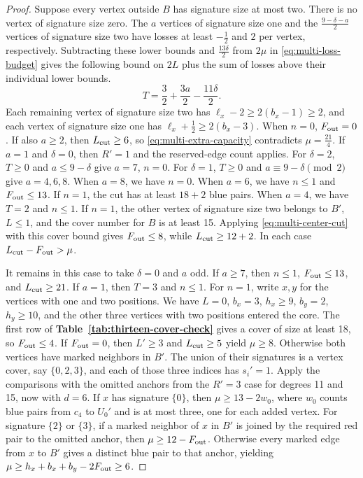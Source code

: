 \documentclass[preprint,11pt,numbers]{elsarticle-arxiv}
\numberwithin{equation}{section}
\theoremstyle{definition}
\begin{document}
\begin{proof}
Suppose every vertex outside $B$ has signature size at most two.
There is no vertex of signature size zero. The $a$ vertices of
signature size one and the $\frac{9-\delta-a}{2}$ vertices of
signature size two have losses at least $-\frac{1}{2}$ and $2$
per vertex, respectively. Subtracting these lower bounds and
$\frac{13\delta}{2}$ from $2\mu$ in \eqref{eq:multi-loss-budget}
gives the following bound on $2L$ plus the sum of losses above
their individual lower bounds.
\[
 T=\frac{3}{2}+\frac{3a}{2}-\frac{11\delta}{2}.
\]
Each remaining vertex of signature size two has
$\ell_x-2\ge2(b_x-1)\ge2$, and each vertex of signature size
one has $\ell_x+\frac{1}{2}\ge2(b_x-3)$. When $n=0$,
$F_{\rm out}=0$. If also $a\ge2$, then $L_{\rm cut}\ge6$,
so \eqref{eq:multi-extra-capacity} contradicts $\mu=\frac{21}{4}$.
If $a=1$ and $\delta=0$, then $R'=1$ and the reserved-edge
count applies. For $\delta=2$, $T\ge0$ and $a\le9-\delta$
give $a=7$, $n=0$. For $\delta=1$, $T\ge0$ and
$a\equiv9-\delta\pmod2$ give $a=4,6,8$. When $a=8$, we have
$n=0$. When $a=6$, we have $n\le1$ and $F_{\rm out}\le13$.
If $n=1$, the cut has at least $18+2$ blue pairs. When
$a=4$, we have $T=2$ and $n\le1$. If $n=1$, the other
vertex of signature size two belongs to $B'$, $L\le1$, and
the cover number for $B$ is at least 15. Applying
\eqref{eq:multi-center-cut} with this cover bound gives
$F_{\rm out}\le8$, while $L_{\rm cut}\ge12+2$. In each
case $L_{\rm cut}-F_{\rm out}>\mu$.

It remains in this case to take $\delta=0$ and $a$ odd. If $a\ge7$,
then $n\le1$, $F_{\rm out}\le13$, and $L_{\rm cut}\ge21$.
If $a=1$, then $T=3$ and $n\le1$. For $n=1$, write $x,y$ for the
vertices with one and two positions. We have $L=0$, $b_x=3$,
$h_x\ge9$, $b_y=2$, $h_y\ge10$, and the other three vertices
with two positions entered the core. The first row of \textbf{Table~\ref{tab:thirteen-cover-check}}
gives a cover of size at least 18, so $F_{\rm out}\le4$. If
$F_{\rm out}=0$, then $L'\ge3$ and $L_{\rm cut}\ge5$ yield
$\mu\ge8$. Otherwise both vertices have marked neighbors in $B'$.
The union of their signatures is a vertex cover, say $\{0,2,3\}$,
and each of those three indices has $s_i'=1$. Apply the comparisons
with the omitted anchors from the $R'=3$ case for degrees 11 and 15,
now with $d=6$. If $x$ has signature $\{0\}$, then
$\mu\ge13-2w_0$, where $w_0$ counts blue pairs from $c_4$ to
$U_0'$ and is at most three, one for each added vertex. For signature
$\{2\}$ or $\{3\}$, if a marked neighbor of $x$ in $B'$ is joined
by the required red pair to the omitted anchor, then
$\mu\ge12-F_{\rm out}$. Otherwise every marked edge from $x$ to
$B'$ gives a distinct blue pair to that anchor, yielding
$\mu\ge h_x+b_x+b_y-2F_{\rm out}\ge6$.


\end{proof}
\end{document}
